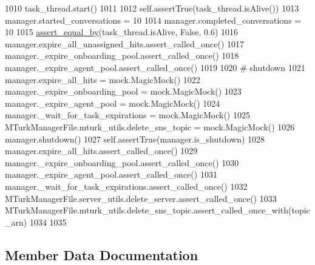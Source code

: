 \begin{DoxyCode}
1010         task\_thread.start()
1011 
1012         self.assertTrue(task\_thread.isAlive())
1013         manager.started\_conversations = 10
1014         manager.completed\_conversations = 10
1015         \hyperlink{namespaceparlai_1_1mturk_1_1core_1_1test_1_1test__mturk__manager_a1fd7ac4fedefa65d2416601107dbe44c}{assert\_equal\_by}(task\_thread.isAlive, \textcolor{keyword}{False}, 0.6)
1016         manager.expire\_all\_unassigned\_hits.assert\_called\_once()
1017         manager.\_expire\_onboarding\_pool.assert\_called\_once()
1018         manager.\_expire\_agent\_pool.assert\_called\_once()
1019 
1020         \textcolor{comment}{# shutdown}
1021         manager.expire\_all\_hits = mock.MagicMock()
1022         manager.\_expire\_onboarding\_pool = mock.MagicMock()
1023         manager.\_expire\_agent\_pool = mock.MagicMock()
1024         manager.\_wait\_for\_task\_expirations = mock.MagicMock()
1025         MTurkManagerFile.mturk\_utils.delete\_sns\_topic = mock.MagicMock()
1026         manager.shutdown()
1027         self.assertTrue(manager.is\_shutdown)
1028         manager.expire\_all\_hits.assert\_called\_once()
1029         manager.\_expire\_onboarding\_pool.assert\_called\_once()
1030         manager.\_expire\_agent\_pool.assert\_called\_once()
1031         manager.\_wait\_for\_task\_expirations.assert\_called\_once()
1032         MTurkManagerFile.server\_utils.delete\_server.assert\_called\_once()
1033         MTurkManagerFile.mturk\_utils.delete\_sns\_topic.assert\_called\_once\_with(topic\_arn)
1034 
1035 
\end{DoxyCode}


\subsection{Member Data Documentation}
\mbox{\label{classparlai_1_1mturk_1_1core_1_1dev_1_1test_1_1test__mturk__manager_1_1TestMTurkManagerLifecycleFunctions_a4ab9d14a9af11d15eec48b95d9dea751}} 
